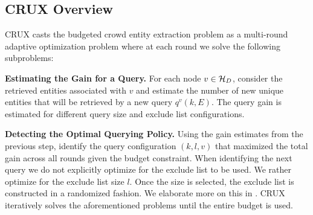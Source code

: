 %
\subsection{CRUX Overview}
\label{sec:framework}
CRUX casts the budgeted crowd entity extraction problem as a multi-round adaptive optimization problem where at each round we solve the following subproblems: 
\squishlist 
\item \textbf{Estimating the Gain for a Query.} For each node $v \in \mathcal{H}_D$, consider the retrieved entities associated with $v$ and estimate the number of new unique entities that will be retrieved by a new query $q^v(k,E)$. The query gain is estimated for different query size and exclude list configurations.
\item \textbf{Detecting the Optimal Querying Policy.} Using the gain estimates from the previous step, identify the query configuration $(k,l,v)$ that maximized the total gain across all rounds given the budget constraint. When identifying the next query we do not explicitly optimize for the exclude list to be used. We rather optimize for the exclude list size $l$. Once the size is selected, the exclude list is constructed in a randomized fashion. We elaborate more on this in .
\squishend
CRUX iteratively solves the aforementioned problems until the entire budget is used. 
%
